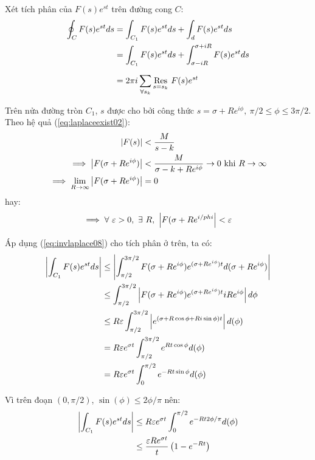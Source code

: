 

Xét tích phân của \(F(s)e^{st}\) trên đường cong \(C\):
\begin{align}
	\nonumber
	\oint_{C} F(s)e^{st}ds &= \int_{C_1}F(s)e^{st}ds + \int_d F(s)e^{st}ds\\
	\label{eq:invlaplace0456}
				  &= \int_{C_1}F(s)e^{st}ds + \int_{\sigma-iR}^{\sigma+iR} F(s)e^{st}ds\\
	\nonumber
				  &= 2\pi i \sum_{\forall s_k}^{\vphantom{n}}\Res{F(s)e^{st}}{s=s_k}
\end{align}

Trên nửa đường tròn \(C_1\), \(s\) được cho bởi công thức \(s=\sigma+Re^{i\phi},{\ \pi/2\le\phi\le3\pi/2}\). Theo hệ quả (\ref{eq:laplaceexist02}):
\begin{align}
	\left\lvert F(s)\right\rvert &< \frac{M}{s-k}\nonumber\\
	\implies \left\lvert F(\sigma+Re^{i\phi})\right\rvert &< \frac{M}{\sigma-k+Re^{i\phi}} \to 0 \text{ khi } \nonumber R \to \infty\\
	\implies \lim_{R \to \infty} \left\lvert F(\sigma+Re^{i\phi})\right\rvert &= 0 \nonumber
\end{align}
hay:
\begin{equation}
	\label{eq:invlaplace08}
	\implies \forall \ \varepsilon > 0,\ \exists\ R,\ \abs{F(\sigma+Re^{i/phi}} < \varepsilon
\end{equation}

Áp dụng (\ref{eq:invlaplace08}) cho tích phân ở trên, ta có:
\begin{align}
	\left\lvert\int_{C_1}F(s)e^{st}ds\right\rvert &\le \left\lvert\int_{\pi/2}^{3\pi/2}F(\sigma+Re^{i\phi})e^{(\sigma+Re^{i\phi})t}d(\sigma+Re^{i\phi})\right\rvert \nonumber\\
				     &\le \int_{\pi/2}^{3\pi/2}\left\lvert F(\sigma+Re^{i\phi})e^{(\sigma+Re^{i\phi})t}iRe^{i\phi}\right\rvert d\phi\nonumber\\
				     &\le R\varepsilon \int_{\pi/2}^{3\pi/2} \left\lvert e^{(\sigma+R\cos\phi + Ri\sin\phi)t}\right\rvert d(\phi) \nonumber\\
				     &= R\varepsilon e^{\sigma t} \int_{\pi/2}^{3\pi/2} e^{Rt\cos\phi}d(\phi) \nonumber\\
				     &= R\varepsilon e^{\sigma t} \int_0^{\pi/2} e^{-Rt\sin\phi}d(\phi) \nonumber
\end{align}

Vì trên đoạn \((0,\pi/2)\), \(\sin(\phi) \le 2\phi/\pi\) nên:
\begin{align}
	\label{eq:invlaplace09}
	\abs{\int_{C_1}F(s)e^{st}ds} &\le R\varepsilon e^{\sigma t} \int_0^{\pi/2} e^{-Rt2\phi/\pi}d(\phi) \nonumber\\
				     &\le \frac{\varepsilon R e^{\sigma t}}{t} \left( 1-e^{-Rt} \right)
\end{align}

